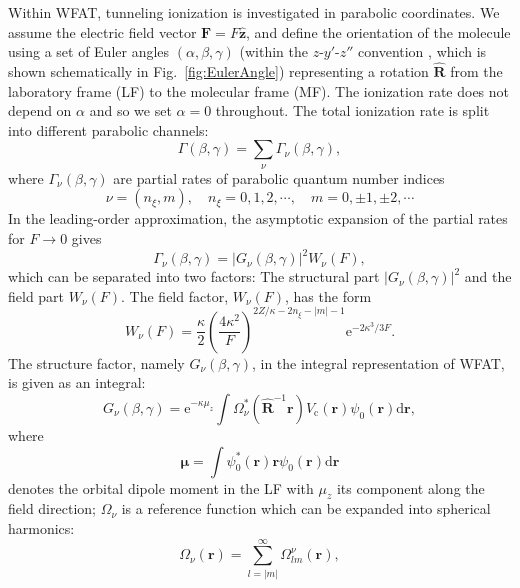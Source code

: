 \documentclass[preprint,12pt]{elsarticle} %
\newcommand{\bn}[1]{\mathbf{#1}}    %
\newcommand{\bi}[1]{\bm{#1}}        %
\renewcommand{\rm}[1]{\mathrm{#1}}    %
\newcommand{\dd}{\mathrm{d}}    %
\newcommand{\ee}{\mathrm{e}}    %
\newcommand{\abs}[1]{\lvert #1 \rvert}  %
\begin{document}
Within WFAT, tunneling ionization is investigated in parabolic coordinates. We assume the electric field vector $\bn{F}=F\hat{\bn{z}}$, and define the orientation of the molecule using a set of Euler angles $(\alpha,\beta,\gamma)$ (within the $z$-$y'$-$z''$ convention \cite{madsen_structure_2017}, which is shown schematically in Fig.~\ref{fig:EulerAngle}) representing a rotation $\hat{\bn{R}}$ from the laboratory frame (LF) to the molecular frame (MF). The ionization rate does not depend on $\alpha$ and so we set $\alpha=0$ throughout. The total ionization rate is split into different parabolic channels:
\begin{equation}
    \Gamma(\beta, \gamma)=\sum_\nu \Gamma_\nu(\beta, \gamma),
\end{equation}
where $\Gamma_\nu(\beta, \gamma)$ are partial rates of parabolic quantum number indices
\begin{equation}
    \nu=(n_\xi,m), \quad n_\xi=0,1,2,\cdots, \quad m=0,\pm 1,\pm 2,\cdots
\end{equation}
In the leading-order approximation, the asymptotic expansion of the partial rates for $F\rightarrow 0$ gives
\begin{equation}
    \Gamma_{\nu}(\beta, \gamma) = \abs{G_\nu(\beta, \gamma)}^2 W_{\nu}(F),
\end{equation}
which can be separated into two factors: The structural part $\abs{G_\nu(\beta, \gamma)}^2$ and the field part $W_{\nu}(F)$.
The field factor, $W_{\nu}(F)$, has the form \cite{ammosov_tunnel_1986,delone_tunneling_1998}
\begin{equation}
    W_{\nu}(F) = \frac{\kappa}{2} \left(\frac{4\kappa^2}{F}\right)^{2Z/\kappa-2n_\xi-\abs{m}-1} \ee^{-{2\kappa^3}/{3F}}.
\end{equation}
The structure factor, namely $G_\nu(\beta, \gamma)$, in the integral representation of WFAT, is given as an integral:
\begin{equation}
    G_\nu (\beta,\gamma) = \ee^{-\kappa\mu_z} \int \Omega_\nu^* \left(\hat{\bn{R}}^{-1} \bn{r}\right) V_{\rm{c}}(\bn{r}) \psi_0(\bn{r}) \dd \bn{r},
    \label{eq:StructFactorExp}
\end{equation}
where
\begin{equation}
    \bi{\mu} = \int \psi_0^*(\bn{r}) \bn{r} \psi_0(\bn{r}) \dd \bn{r}
\end{equation}
denotes the orbital dipole moment in the LF with $\mu_z$ its component along the field direction;
$\Omega_\nu$ is a reference function which can be expanded into spherical harmonics:
\begin{equation}
    \Omega_\nu(\bn{r}) = \sum_{l=|m|}^{\infty} \Omega^\nu_{lm}(\bn{r}),
    \label{eq:OmegaExpansion1}
\end{equation}
\end{document}

